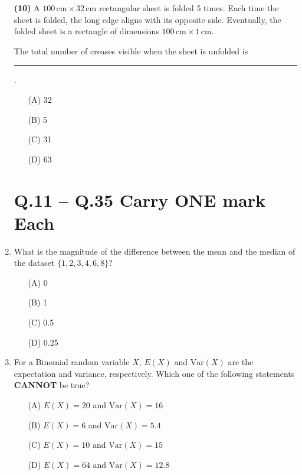 \documentclass[journal]{IEEEtran}
\begin{document}
\begin{enumerate}
   \textbf {(10)}
A \(100 \, \text{cm} \times 32 \, \text{cm}\) rectangular sheet is folded 5 times. Each time the sheet is folded, the long edge aligns with its opposite side. Eventually, the folded sheet is a rectangle of dimensions \(100 \, \text{cm} \times 1 \, \text{cm}\).



The total number of creases visible when the sheet is unfolded is \rule{2cm}{0.15mm}.



\begin{enumerate}
    \item[(A)] 32
    \item[(B)] 5
    \item[(C)] 31
    \item[(D)] 63
\end{enumerate}
\hfill{}

\section*{Q.11 -- Q.35 Carry ONE mark Each}

\item  What is the magnitude of the difference between the mean and the median of the dataset \(\{1, 2, 3, 4, 6, 8\}\)?

\begin{enumerate}
    \item[(A)] 0
    \item[(B)] 1
    \item[(C)] 0.5
    \item[(D)] 0.25
\end{enumerate}
\hfill{}

 \item 
For a Binomial random variable \(X\), \(E(X)\) and \(\text{Var}(X)\) are the expectation and variance, respectively. Which one of the following statements \textbf{CANNOT} be true?

\begin{enumerate}
    \item[(A)] \(E(X) = 20\) and \(\text{Var}(X) = 16\)
    \item[(B)] \(E(X) = 6\) and \(\text{Var}(X) = 5.4\)
    \item[(C)] \(E(X) = 10\) and \(\text{Var}(X) = 15\)
    \item[(D)] \(E(X) = 64\) and \(\text{Var}(X) = 12.8\)
\end{enumerate}
\hfill{}


\end{enumerate}
\end{document}
